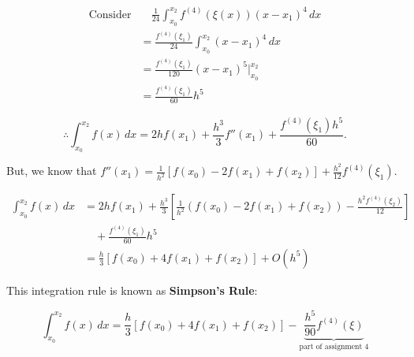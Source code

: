 \documentclass[12pt]{article}
\begin{document}
\begin{align*}
  \text{Consider} &\quad \frac{1}{24} \int_{x_0}^{x_2} f^{(4)}(\xi(x)) (x - x_1)^4 \, dx \\
                  &= \frac{f^{(4)}(\xi_1)}{24} \int_{x_0}^{x_2} (x - x_1)^4 \, dx \\
                  &= \frac{f^{(4)}(\xi_1)}{120} (x - x_1)^5 \Big|_{x_0}^{x_2} \\
                  &= \frac{f^{(4)}(\xi_1)}{60} h^5
\end{align*}

\[
  \therefore 
    \int_{x_0}^{x_2}f(x) \, dx = 2hf(x_1) + \frac{h^3}{3}f''(x_1) +
    \frac{f^{(4)}(\xi_1)h^5}{60}
.\]

But, we know that $\displaystyle f''(x_1) = \frac{1}{h^2} \left[ f(x_0) -2f(x_1) + f(x_2)
\right] + \frac{h^2}{12}f^{(4)}(\xi_1)$.

\begin{align*}
  \int_{x_0}^{x_2}f(x) \, dx &= 2hf(x_1) +
  \frac{h^3}{3}\left[\frac{1}{h^2}(f(x_0) - 2f(x_1) + f(x_2))
  -\frac{h^2 f^{(4)}(\xi_2)}{12} \right] \\
                             &\quad+ \frac{f^{(4)}(\xi_1)}{60}h^5\\
                             &= \frac{h}{3}\left[f(x_0)+4f(x_1)+f(x_2)\right]+O(h^5)
\end{align*}

This integration rule is known as \textbf{Simpson's Rule}:

\[
  \int_{x_0}^{x_2} f(x) \, dx = \frac{h}{3} \left[f(x_0)+4f(x_1)+f(x_2)\right] -
  \underbrace{\frac{h^5}{90}f^{(4)}(\xi)}_{\text{part of assignment 4}}
\]
\end{document}
